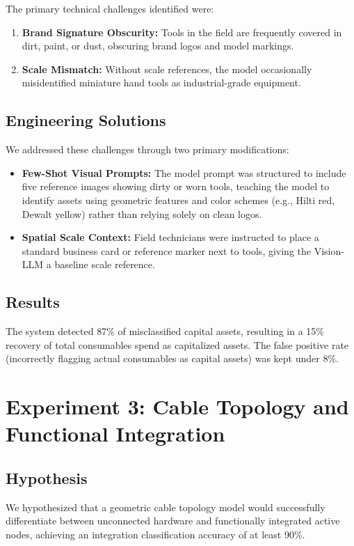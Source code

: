 \documentclass[11pt,letterpaper]{report}
\begin{document}
The primary technical challenges identified were:
\begin{enumerate}
    \item \textbf{Brand Signature Obscurity:} Tools in the field are frequently covered in dirt, paint, or dust, obscuring brand logos and model markings.
    \item \textbf{Scale Mismatch:} Without scale references, the model occasionally misidentified miniature hand tools as industrial-grade equipment.
\end{enumerate}

\subsection{Engineering Solutions}
We addressed these challenges through two primary modifications:
\begin{itemize}
    \item \textbf{Few-Shot Visual Prompts:} The model prompt was structured to include five reference images showing dirty or worn tools, teaching the model to identify assets using geometric features and color schemes (e.g., Hilti red, Dewalt yellow) rather than relying solely on clean logos.
    \item \textbf{Spatial Scale Context:} Field technicians were instructed to place a standard business card or reference marker next to tools, giving the Vision-LLM a baseline scale reference.
\end{itemize}

\subsection{Results}
The system detected 87\% of misclassified capital assets, resulting in a 15\% recovery of total consumables spend as capitalized assets. The false positive rate (incorrectly flagging actual consumables as capital assets) was kept under 8\%.

\section{Experiment 3: Cable Topology and Functional Integration}

\subsection{Hypothesis}
We hypothesized that a geometric cable topology model would successfully differentiate between unconnected hardware and functionally integrated active nodes, achieving an integration classification accuracy of at least 90\%.
\end{document}
